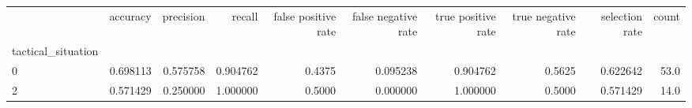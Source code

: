 \begin{tabular}{lrrrrrrrrr}
\toprule
{} &  accuracy &  precision &    recall &  false positive rate &  false negative rate &  true positive rate &  true negative rate &  selection rate &  count \\
tactical\_situation &           &            &           &                      &                      &                     &                     &                 &        \\
\midrule
0                  &  0.698113 &   0.575758 &  0.904762 &               0.4375 &             0.095238 &            0.904762 &              0.5625 &        0.622642 &   53.0 \\
2                  &  0.571429 &   0.250000 &  1.000000 &               0.5000 &             0.000000 &            1.000000 &              0.5000 &        0.571429 &   14.0 \\
\bottomrule
\end{tabular}
